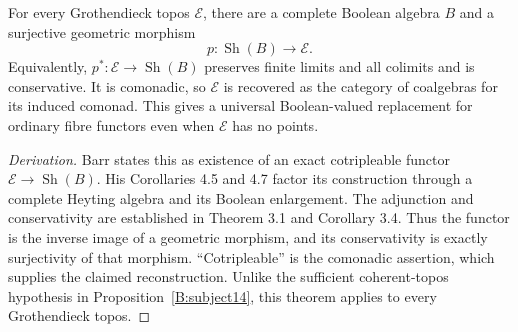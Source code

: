 \begin{theorem}\label{B:Boolean-localization}
For every Grothendieck topos $\mathcal E$, there are a complete Boolean algebra $B$ and a surjective geometric morphism
\[
 p:\operatorname{Sh}(B)\longrightarrow\mathcal E.
\]
Equivalently, $p^*:\mathcal E\to\operatorname{Sh}(B)$ preserves finite limits and all colimits and is conservative. It is comonadic, so $\mathcal E$ is recovered as the category of coalgebras for its induced comonad. This gives a universal Boolean-valued replacement for ordinary fibre functors even when $\mathcal E$ has no points.
\end{theorem}
\begin{proof}[Derivation]
Barr \cite[Theorem 4.1]{BBarr1974} states this as existence of an exact cotripleable functor $\mathcal E\to\operatorname{Sh}(B)$. His Corollaries 4.5 and 4.7 factor its construction through a complete Heyting algebra and its Boolean enlargement. The adjunction and conservativity are established in Theorem 3.1 and Corollary 3.4. Thus the functor is the inverse image of a geometric morphism, and its conservativity is exactly surjectivity of that morphism. ``Cotripleable'' is the comonadic assertion, which supplies the claimed reconstruction. Unlike the sufficient coherent-topos hypothesis in Proposition~\ref{B:subject14}, this theorem applies to every Grothendieck topos.
\end{proof}

